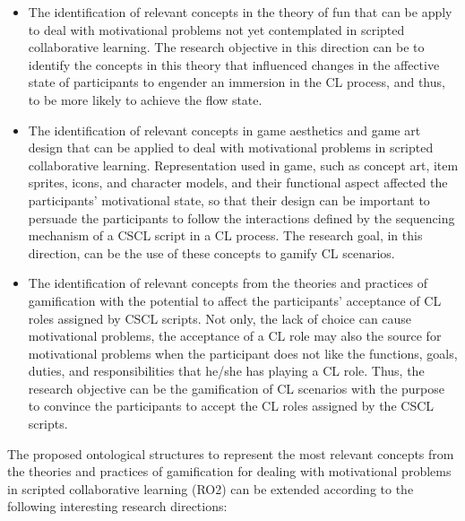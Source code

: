 \begin{itemize}
\item The identification of relevant concepts in the theory of fun \cite{Koster2004, Lazzaro2009} that can be apply to deal with motivational problems not yet contemplated in scripted collaborative learning.%
The research objective in this direction can be to identify the concepts in this theory that influenced changes in the affective state of participants to engender an immersion in the CL process, and thus, to be more likely to achieve the flow state.


\item The identification of relevant concepts in game aesthetics and game art design \cite{NamKimKimLee2016, Dickey2012} that can be applied to deal with motivational problems in scripted collaborative learning.
Representation used in game, such as concept art, item sprites, icons, and character models, and their functional aspect affected the participants' motivational state, so that their design can be important to persuade the participants to follow the interactions defined by the sequencing mechanism of a CSCL script in a CL process.
The research goal, in this direction, can be the use of these concepts to gamify CL scenarios.

\item The identification of relevant concepts from the theories and practices of gamification with the potential to affect the participants' acceptance of CL roles assigned by CSCL scripts.
Not only, the lack of choice can cause motivational problems, the acceptance of a CL role may also the source for motivational problems when the participant does not like the functions, goals, duties, and responsibilities that he/she has playing a CL role.
Thus, the research objective can be the gamification of CL scenarios with the purpose to convince the participants to accept the CL roles assigned by the CSCL scripts.
\end{itemize}

The proposed ontological structures to represent the most relevant concepts from the theories and practices of gamification for dealing with motivational problems in scripted collaborative learning (RO2) can be extended according to the following interesting research directions:

